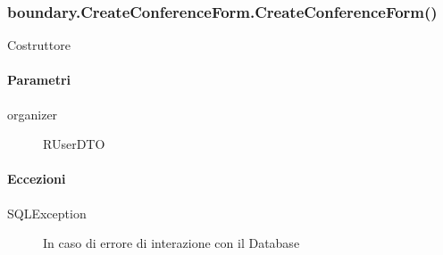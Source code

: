 \subsubsection{boundary.CreateConferenceForm.CreateConferenceForm()}
Costruttore
\paragraph{Parametri}
\begin{description}
\item[organizer] RUserDTO
\end{description}
\paragraph{Eccezioni}
\begin{description}
\item[SQLException]  In caso di errore di interazione con il Database
\end{description}














